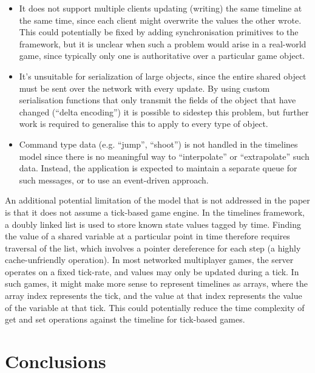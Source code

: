\documentclass[conference]{IEEEtran}
\begin{document}
	\begin{itemize}
		\item It does not support multiple clients updating (writing) the same timeline at the same time, since each client might overwrite the values the other wrote. This could potentially be fixed by adding synchronisation primitives to the framework, but it is unclear when such a problem would arise in a real-world game, since typically only one is authoritative over a particular game object.
		\item It's unsuitable for serialization of large objects, since the entire shared object must be sent over the network with every update. By using custom serialisation functions that only transmit the fields of the object that have changed (``delta encoding'') it is possible to sidestep this problem, but further work is required to generalise this to apply to every type of object.
		\item Command type data (e.g. ``jump'', ``shoot'') is not handled in the timelines model since there is no meaningful way to ``interpolate'' or ``extrapolate'' such data. Instead, the application is expected to maintain a separate queue for such messages, or to use an event-driven approach.
	\end{itemize}

	An additional potential limitation of the model that is not addressed in the paper is that it does not assume a tick-based game engine. In the timelines framework, a doubly linked list is used to store known state values tagged by time. Finding the value of a shared variable at a particular point in time therefore requires traversal of the list, which involves a pointer dereference for each step (a highly cache-unfriendly operation). In most networked multiplayer games, the server operates on a fixed tick-rate, and values may only be updated during a tick. In such games, it might make more sense to represent timelines as arrays, where the array index represents the tick, and the value at that index represents the value of the variable at that tick. This could potentially reduce the time complexity of get and set operations against the timeline for tick-based games.

	\section{Conclusions}
\end{document}
